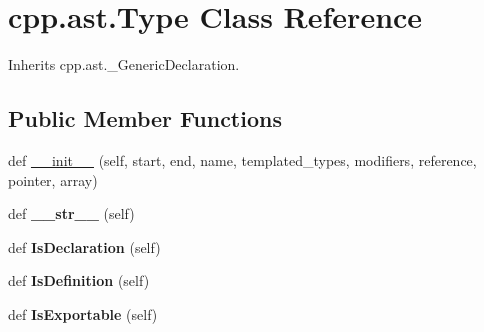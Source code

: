 \hypertarget{classcpp_1_1ast_1_1Type}{}\section{cpp.\+ast.\+Type Class Reference}
\label{classcpp_1_1ast_1_1Type}


Inherits cpp.\+ast.\+\_\+\+Generic\+Declaration.

\subsection*{Public Member Functions}
\begin{DoxyCompactItemize}
\item 
def \mbox{\hyperlink{classcpp_1_1ast_1_1Type_adc20d88db721b5d7b513c08a4d6753c9}{\+\_\+\+\_\+init\+\_\+\+\_\+}} (self, start, end, name, templated\+\_\+types, modifiers, reference, pointer, array)
\item 
\mbox{\label{classcpp_1_1ast_1_1Type_a1a10eff21f6150b7e14bde3788fa069b}} 
def {\bfseries \+\_\+\+\_\+str\+\_\+\+\_\+} (self)
\item 
\mbox{\label{classcpp_1_1ast_1_1Type_a590071a2bce7ea5140d7eb86c90f63bf}} 
def {\bfseries Is\+Declaration} (self)
\item 
\mbox{\label{classcpp_1_1ast_1_1Type_aedff25dc3736e83388742e55fe29159b}} 
def {\bfseries Is\+Definition} (self)
\item 
\mbox{\label{classcpp_1_1ast_1_1Type_a80dce781581c03e550ce51a9a33ca158}} 
def {\bfseries Is\+Exportable} (self)
\end{DoxyCompactItemize}
